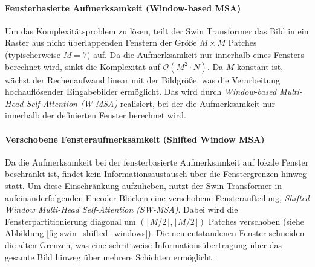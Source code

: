 \paragraph{Fensterbasierte Aufmerksamkeit (Window-based MSA)}
Um das Komplexitätsproblem zu lösen, teilt der Swin Transformer das Bild in ein Raster aus nicht überlappenden Fenstern der Größe $M \times M$ Patches (typischerweise $M=7$) auf. Da die Aufmerksamkeit nur innerhalb eines Fensters berechnet wird, sinkt die Komplexität auf $\mathcal{O}(M^2 \cdot N)$. Da $M$ konstant ist, wächst der Rechenaufwand linear mit der Bildgröße, was die Verarbeitung hochauflösender Eingabebilder ermöglicht. Das wird durch \emph{Window-based Multi-Head Self-Attention (W-MSA)} realisiert, bei der die Aufmerksamkeit nur innerhalb der definierten Fenster berechnet wird.

\paragraph{Verschobene Fensteraufmerksamkeit (Shifted Window MSA)}
Da die Aufmerksamkeit bei der fensterbasierte Aufmerksamkeit auf lokale Fenster beschränkt ist, findet kein Informationsaustausch über die Fenstergrenzen hinweg statt. Um diese Einschränkung aufzuheben, nutzt der Swin Transformer in aufeinanderfolgenden Encoder-Blöcken eine verschobene Fensteraufteilung, \emph{Shifted Window Multi-Head Self-Attention (SW-MSA)}. Dabei wird die Fensterpartitionierung diagonal um $(\lfloor M/2 \rfloor, \lfloor M/2 \rfloor)$ Patches verschoben (siehe Abbildung \ref{fig:swin_shifted_windows}). Die neu entstandenen Fenster schneiden die alten Grenzen, was eine schrittweise Informationsübertragung über das gesamte Bild hinweg über mehrere Schichten ermöglicht.

